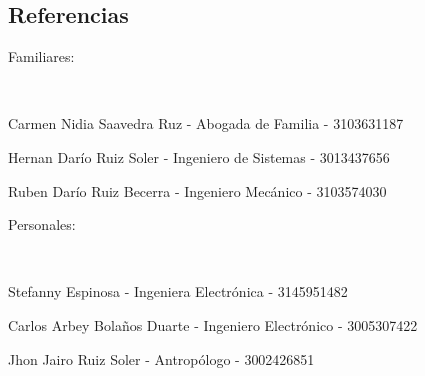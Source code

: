 \documentclass[10pt,a4paper]{article}
\newenvironment{indentsection}[1]%
{\begin{list}{}%
	{\setlength{\leftmargin}{#1}}%
	\item[]%
}
{\end{list}}
\begin{document}
\subsection*{Referencias}
\begin{indentsection}{\parindent}
\begin{description*}
	\item[Familiares:]
	
	\begin{itemize*}
		\
		\item
		\item Carmen Nidia Saavedra Ruz - Abogada de Familia - 3103631187
		\item Hernan Darío Ruiz Soler - Ingeniero de Sistemas - 3013437656
		\item Ruben Darío Ruiz Becerra - Ingeniero Mecánico - 3103574030
	\end{itemize*}

	\item[Personales:]
	
	\begin{itemize*}
		\
		\item
		\item Stefanny Espinosa - Ingeniera Electrónica -  3145951482
		\item Carlos Arbey Bolaños Duarte - Ingeniero Electrónico -  3005307422
		\item Jhon Jairo Ruiz Soler - Antropólogo - 3002426851
	\end{itemize*}
\end{description*}
\end{indentsection}
\end{document}
